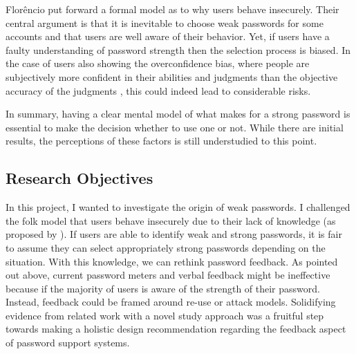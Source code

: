Florêncio \etal put forward a formal model as to why users behave insecurely. Their central argument is that it is inevitable to choose weak passwords for some accounts and that users are well aware of their behavior. Yet, if users have a faulty understanding of password strength then the selection process is biased. In the case of users also showing the overconfidence bias, where people are subjectively more confident in their abilities and judgments than the objective accuracy of the judgments \cite{Simonson1989ChoiceBasedOnReasons}, this could indeed lead to considerable risks.  %

In summary, having a clear mental model of what makes for a strong password is essential to make the decision whether to use one or not. While there are initial results, the perceptions of these factors is still understudied to this point.

\subsection{Research Objectives}
In this project, I wanted to investigate the origin of weak passwords. I challenged the folk model that users behave insecurely due to their lack of knowledge (as proposed by \ar). If users are able to identify weak and strong passwords, it is fair to assume they can select appropriately strong passwords depending on the situation. With this knowledge, we can rethink password feedback. As pointed out above, current password meters and verbal feedback might be ineffective because if the majority of users is aware of the strength of their password. Instead, feedback could be framed around re-use or attack models. Solidifying evidence from related work with a novel study approach was a fruitful step towards making a holistic design recommendation regarding the feedback aspect of password support systems. 


